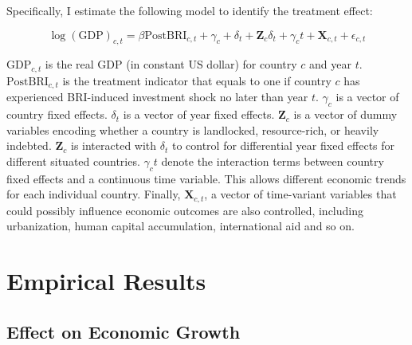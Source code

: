 \documentclass[10pt,a4paper]{article}
\begin{document}
Specifically, I estimate the following model to identify the treatment
effect:

\begin{equation}
\label{eq:baseline}
\log(\textrm{GDP})_{c,t} = \beta\textrm{PostBRI}_{c,t} + \gamma_c + \delta_t + \mathbf{Z}_c\delta_t + \gamma_c t + \mathbf{X}_{c,t} + \epsilon_{c,t}
\end{equation}

$\textrm{GDP}_{c,t}$ is the real GDP (in constant US dollar) for country $c$ and year $t$.
$\textrm{PostBRI}_{c,t}$ is the treatment indicator that equals to one if country $c$ has experienced BRI-induced investment shock no later than year $t$.
$\gamma_c$ is a vector of country fixed effects.
$\delta_t$ is a vector of year fixed effects.
$\mathbf{Z}_c$ is a vector of dummy variables encoding whether a country is landlocked, resource-rich, or heavily indebted. $\mathbf{Z}_c$ is interacted with $\delta_t$ to control for differential year fixed effects for different situated countries.
$\gamma_c t $ denote the interaction terms between country fixed effects and a continuous time variable. This allows different economic trends for each individual country.
Finally, $\mathbf{X}_{c,t}$, a vector of time-variant variables that could possibly influence economic outcomes are also controlled, including urbanization, human capital accumulation, international aid and so on.



\section{\texorpdfstring{{Empirical
Results}}{Empirical Results}}

{\label{411455}}

\subsection{Effect on Economic Growth}

{\label{783625}}
\end{document}
